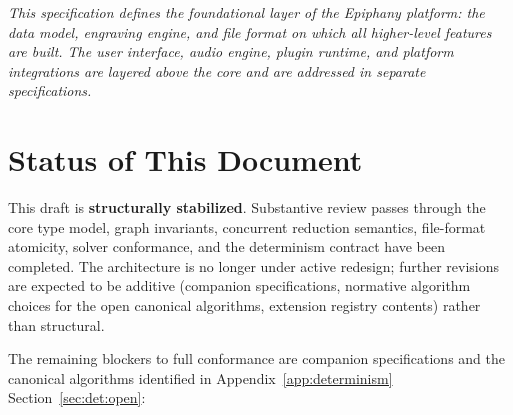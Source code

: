 \documentclass[11pt,letterpaper]{report}
\begin{document}
\begin{titlepage}
  \vspace{0.7in}


  \vspace{0.5in}

  \begin{minipage}{0.72\textwidth}
    \centering
    \itshape\color{epiphanyslate}
    \footnotesize
    This specification defines the foundational layer of the
    Epiphany platform: the data model, engraving engine, and file
    format on which all higher-level features are built. The user
    interface, audio engine, plugin runtime, and platform
    integrations are layered above the core and are addressed in
    separate specifications.
  \end{minipage}

  \vfill
\end{titlepage}


\chapter*{Status of This Document}

This draft is \textbf{structurally stabilized}. Substantive
review passes through the core type model, graph invariants,
concurrent reduction semantics, file-format atomicity, solver
conformance, and the determinism contract have been completed.
The architecture is no longer under active redesign; further
revisions are expected to be additive (companion specifications,
normative algorithm choices for the open canonical algorithms,
extension registry contents) rather than structural.

The remaining blockers to full conformance are companion
specifications and the canonical algorithms identified in
Appendix~\ref{app:determinism}
Section~\ref{sec:det:open}:
\end{document}
